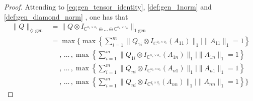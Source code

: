\begin{proof}
  Attending to \autoref{eq:gen_tensor_identity}, \autoref{def:gen_1norm} and \autoref{def:gen_diamond_norm} , one has that
  \begin{equation} \label{eq:q_diamondgen_extendido}
    \begin{split}
      \lVert Q \rVert_{\diamondsuit \text{ gen}}  & = \lVert Q \otimes I_{\mathbb{C}^{o_1 \times o_1} \oplus \ldots \oplus \mathbb{C}^{o_n \times o_n}} \rVert_{1 \text{ gen}} \\
      & =  \max  \Bigg\{ \max \left\{ \sum_{i=1}^{m} \|Q_{1i} \otimes I_{\mathbb{C}^{o_1 \times o_1}} (A_{11})\|_{1}    \mid  \|A_{11}\|_{1} = 1 \right\} \\
      & \hspace{15pt}, \hspace{2pt} \ldots \hspace{2pt}, \max \left\{ \sum_{i=1}^{m} \|Q_{1i} \otimes I_{\mathbb{C}^{o_n \times o_n}} (A_{1n})\|_{1}    \mid  \|A_{1n}\|_{1} = 1 \right\} \\ 
      & \hspace{15pt}, \hspace{2pt} \ldots \hspace{2pt}, \max \left\{ \sum_{i=1}^{m} \|Q_{ni} \otimes I_{\mathbb{C}^{o_1 \times o_1}} (A_{n1})\|_{1}    \mid  \|A_{n1}\|_{1} = 1 \right\} \\
    & \hspace{15pt}, \hspace{2pt} \ldots \hspace{2pt}, \max \left\{ \sum_{i=1}^{m} \|Q_{ni} \otimes I_{\mathbb{C}^{q_t \times q_t}} (A_{nn})\|_{1}   \mid  \|A_{nn}\|_{1} = 1 \right\} \Bigg\} 
    \end{split}
  \end{equation}

 


\end{proof}
